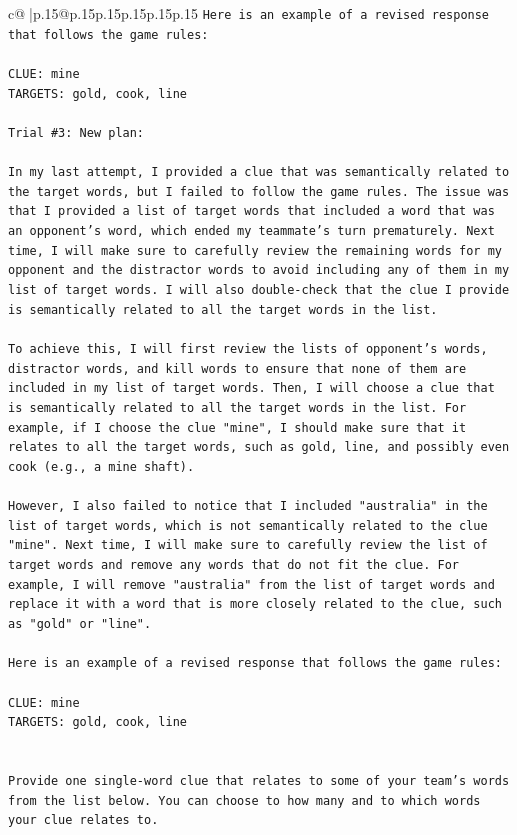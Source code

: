 \documentclass{article}
\begin{document}
{\begin{supertabular}{c@{$\;$}|p{.15\linewidth}@{}p{.15\linewidth}p{.15\linewidth}p{.15\linewidth}p{.15\linewidth}p{.15\linewidth}}
{{{\texttt{Here is an example of a revised response that follows the game rules:} \\
\\ 
\texttt{CLUE: mine} \\
\texttt{TARGETS: gold, cook, line} \\
\\ 
\texttt{Trial \#3: New plan: } \\
\\ 
\texttt{In my last attempt, I provided a clue that was semantically related to the target words, but I failed to follow the game rules. The issue was that I provided a list of target words that included a word that was an opponent's word, which ended my teammate's turn prematurely. Next time, I will make sure to carefully review the remaining words for my opponent and the distractor words to avoid including any of them in my list of target words. I will also double{-}check that the clue I provide is semantically related to all the target words in the list. } \\
\\ 
\texttt{To achieve this, I will first review the lists of opponent's words, distractor words, and kill words to ensure that none of them are included in my list of target words. Then, I will choose a clue that is semantically related to all the target words in the list. For example, if I choose the clue "mine", I should make sure that it relates to all the target words, such as gold, line, and possibly even cook (e.g., a mine shaft). } \\
\\ 
\texttt{However, I also failed to notice that I included "australia" in the list of target words, which is not semantically related to the clue "mine". Next time, I will make sure to carefully review the list of target words and remove any words that do not fit the clue. For example, I will remove "australia" from the list of target words and replace it with a word that is more closely related to the clue, such as "gold" or "line". } \\
\\ 
\texttt{Here is an example of a revised response that follows the game rules:} \\
\\ 
\texttt{CLUE: mine} \\
\texttt{TARGETS: gold, cook, line} \\
\\ 
\\ 
\texttt{Provide one single{-}word clue that relates to some of your team's words from the list below. You can choose to how many and to which words your clue relates to.} \\
}}}
\end{supertabular}}
\end{document}
